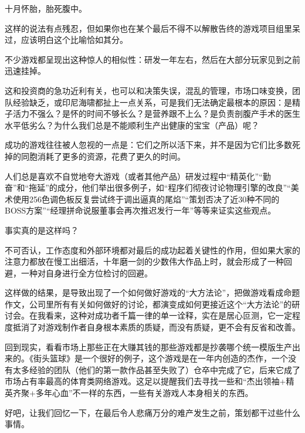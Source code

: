 \documentclass{article}
\begin{document}
十月怀胎，胎死腹中。



这样的说法有点残忍，但如果你也在某个最后不得不以解散告终的游戏项目组里呆过，应该明白这个比喻恰如其分。



不少游戏都呈现出这种惊人的相似性：研发一年左右，然后在大部分玩家见到之前迅速挂掉。



这和投资商的急功近利有关，也可以和决策失误，混乱的管理，市场口味变换，团队经验缺乏，或印尼海啸都扯上一点关系，可是我们无法确定最根本的原因：是精子活力不强么？是怀的时间不够长么？是营养跟不上么？是负责剖腹产手术的医生水平低劣么？为什么我们总是不能顺利生产出健康的宝宝（产品）呢？



成功的游戏往往被人忽视的一点是：它们之所以活下来，并不是因为它们比多数死掉的同胞消耗了更多的资源，花费了更久的时间。



人们总是喜欢不自觉地夸大游戏（或者其他产品）研发过程中“精英化”“勤奋”和“拖延”的成分，他们举出很多例子，如“程序们彻夜讨论物理引擎的改良”“美术使用256色调色板反复尝试终于调出逼真的尾焰”“策划否决了近30种不同的BOSS方案”“经理拼命说服董事会再次推迟发行一年”等等来证实这些观点。



事实真的是这样吗？



不可否认，工作态度和外部环境都对最后的成功起着关键性的作用，但如果大家的注意力都放在慢工出细活，十年磨一剑的少数伟大作品上时，就会形成了一种回避，一种对自身进行全方位检讨的回避。



这样做的结果，是导致出现了一个如何做好游戏的“大方法论”，把做游戏看成命题作文，公司里所有有关如何做好的讨论，都演变成如何更接近这个“大方法论”的研讨会。在我看来，这种对成功者千篇一律的单一诠释，实在是居心叵测，它一定程度抵消了对游戏制作者自身根本素质的质疑，而没有质疑，更不会有反省和改善。



回到现实，看看市场上那些正在大赚其钱的那些游戏都是抄袭哪个统一模版生产出来的。《街头篮球》是一个很好的例子，这个游戏是在一年内创造的杰作，一个没有太多经验的团队（他们的第一款作品甚至失败了）仓卒中完成了它，后来它成了市场占有率最高的体育类网络游戏。这足以提醒我们去寻找一些和“杰出领袖+精英齐聚+多年心血”不一样的东西，一些有关游戏人本身相关的东西。



好吧，让我们回忆一下，在最后令人悲痛万分的难产发生之前，策划都干过些什么事情。
\end{document}
